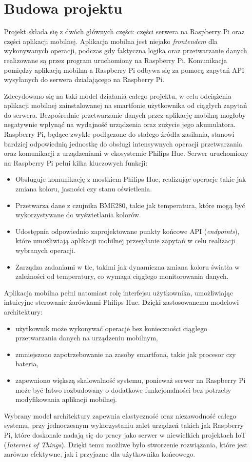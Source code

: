 \documentclass[12pt]{article}
\begin{document}
\clearpage


\section{Budowa projektu}
Projekt składa się z dwóch głównych części: części serwera na Raspberry Pi oraz części aplikacji mobilnej. Aplikacja mobilna jest niejako \textit{frontendem}
dla wykonywanych operacji, podczas gdy faktyczna logika oraz przetwarzanie danych realizowane są przez program uruchomiony na Raspberry Pi. Komunikacja pomiędzy aplikacją
mobilną a Raspberry Pi odbywa się za pomocą zapytań API wysyłanych do serwera działającego na Raspberry Pi.

Zdecydowano się na taki model działania całego projektu, w celu odciążenia aplikacji mobilnej zainstalowanej na smartfonie użytkownika od ciągłych zapytań do serwera.
Bezpośrednie przetwarzanie danych przez aplikację mobilną mogłoby negatywnie wpłynąć na wydajność urządzenia oraz zużycie jego akumulatora. Raspberry Pi, będące zwykle
podłączone do stałego źródła zasilania, stanowi bardziej odpowiednią jednostkę do obsługi intensywnych operacji przetwarzania oraz komunikacji z urządzeniami w ekosystemie Philips Hue.
Serwer uruchomiony na Raspberry Pi pełni kilka kluczowych funkcji:
\begin{itemize}
    \item Obsługuje komunikację z mostkiem Philips Hue, realizując operacje takie jak zmiana koloru, jasności czy stanu oświetlenia.
    \item Przetwarza dane z czujnika BME280, takie jak temperatura, które mogą być wykorzystywane do wyświetlania kolorów.
    \item Udostępnia odpowiednio zaprojektowane punkty końcowe API (\textit{endpoints}), które umożliwiają aplikacji mobilnej przesyłanie zapytań w celu realizacji wybranych operacji.
    \item Zarządza zadaniami w tle, takimi jak dynamiczna zmiana koloru światła w zależności od temperatury, co wymaga ciągłego monitorowania danych.
\end{itemize}
Aplikacja mobilna pełni natomiast rolę interfejsu użytkownika, umożliwiając intuicyjne sterowanie żarówkami Philips Hue. Dzięki zastosowanemu modelowi architektury:
\begin{itemize}
    \item użytkownik może wykonywać operacje bez konieczności ciągłego przetwarzania danych na urządzeniu mobilnym,
    \item zmniejszono zapotrzebowanie na zasoby smartfona, takie jak procesor czy bateria,
    \item zapewniono większą skalowalność systemu, ponieważ serwer na Raspberry Pi może być łatwo rozbudowany o dodatkowe funkcjonalności bez potrzeby modyfikowania aplikacji mobilnej.
\end{itemize}
Wybrany model architektury zapewnia elastyczność oraz niezawodność całego systemu, przy jednoczesnym wykorzystaniu zalet urządzeń takich jak Raspberry Pi, które doskonale nadają się do pracy
jako serwer w niewielkich projektach IoT (\textit{Internet of Things}). Dzięki temu możliwe było stworzenie rozwiązania, które jest zarówno efektywne, jak i przyjazne dla użytkownika końcowego.
\end{document}
